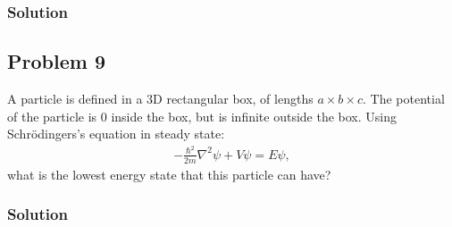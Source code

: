 \subsubsection*{Solution}

\subsection*{Problem 9}
A particle is defined in a 3D rectangular box, of lengths $a \times b \times c$. The potential of the particle is 0 inside the box, but is infinite outside the box.
Using Schrödingers's equation in steady state:
\begin{align*}
    -\frac{\hbar^2}{2m}\nabla^2\psi + V\psi= E\psi,
\end{align*}what is the lowest energy state that this particle can have?

\subsubsection*{Solution}
